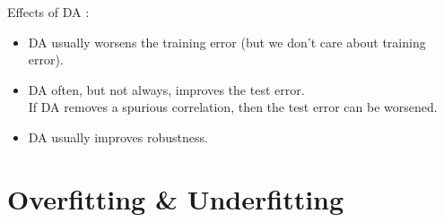 \begin{definition}
    Effects of DA :

    \begin{itemize}
        \item DA usually worsens the training error (but we don't care about training error).
        \item
        DA often, but not always, improves the test error.\\

        If DA removes a spurious correlation, then the test error can be worsened.
        \item DA usually improves robustness.
    \end{itemize}
\end{definition}

\section{Overfitting \& Underfitting}

